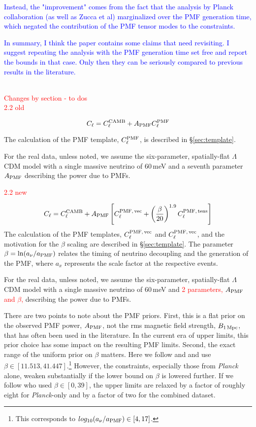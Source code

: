 \documentclass{article}
\newcommand{\cpmf}{\ensuremath{C_{\ell}^{\rm PMF}}}
\newcommand{\cpmftens}{\ensuremath{C_{\ell}^{\rm PMF,\,tens}}}
\newcommand{\cpmfvec}{\ensuremath{C_{\ell}^{\rm PMF,\,vec}}}
\newcommand{\apmf}{\ensuremath{A_{\rm PMF}}}
\newcommand{\bpmf}{\ensuremath{B_{\rm 1\,Mpc}}}
\newcommand{\lcdm}{\ensuremath{\Lambda}CDM}
\newcommand{\be}{\begin{equation}}
\newcommand{\ee}{\end{equation}}
\newcommand{\planck}{{\sl Planck}}
\newcommand{\changed}[1]{\textcolor{Red}{#1}}
\begin{document}
\textcolor{blue}{Instead, the "improvement" comes from the fact that the analysis by Planck collaboration (as well as Zucca et al) marginalized over the PMF generation time, which negated the contribution of the PMF tensor modes to the constraints.}

\textcolor{blue}{In summary, I think the paper contains some claims that need revisiting. I suggest repeating the analysis with the PMF generation time set free and report the bounds in that case. Only then they can be seriously compared to previous results in the literature.}



\\
\textcolor{red}{Changes by section - to dos}
\\


\changed{2.2 old}

\be
C_\ell = C_\ell^{\rm{CAMB}} + \apmf \cpmf
\ee

The calculation of the PMF template, \cpmf, is described in \S\ref{sec:template}.

For the real data, unless noted, we assume the six-parameter, spatially-flat \lcdm{} model with a single massive neutrino of 60\,meV and a seventh parameter \apmf{} describing the power due to PMFs. 

\changed{2.2 new}

\be
C_\ell = C_\ell^{\rm{CAMB}} + \apmf \left[\cpmfvec + \left(\frac{\beta}{20}\right)^{1.9}  \cpmftens \right]
\ee
The calculation of the PMF templates, \cpmfvec{} and \cpmfvec{}, and the motivation for the $\beta$ scaling are described in \S\ref{sec:template}. 
The parameter $\beta = {\rm ln}(a_{\nu}/a_{\rm{PMF}})$ relates the timing of neutrino decoupling and the generation of the PMF, where $a_x$ represents the scale factor at the respective events.

For the real data, unless noted, we assume the six-parameter, spatially-flat \lcdm{} model with a single massive neutrino of 60\,meV and \changed{2 parameters, \apmf{} and $\beta$, }describing the power due to PMFs.

There are two points to note about the PMF priors. 
First, this is a flat prior on the observed PMF power, $\apmf$, not the rms magnetic field strength, \bpmf, that has often been used in the literature. 
In the current era of upper limits, this prior choice has some impact on the resulting PMF limits. 
Second, the exact range of the uniform prior on $\beta$ matters. 
Here we follow \citet{planck15-19} and \citet{zucca16} and use $\beta \in [11.513, 41.447]$.\footnote{This corresponds to $log_{10} (a_{\nu}/a_{\rm{PMF}}) \in[4,17]$.}
However, the constraints, especially those from \planck{} alone, weaken substantially if the lower bound on $\beta$ is lowered further. 
If we follow \citet{polarbear15} who used $\beta \in [0,39]$, the upper limits are relaxed by a factor of roughly eight for \planck-only and by a factor of two for the combined dataset. 
\end{document}
